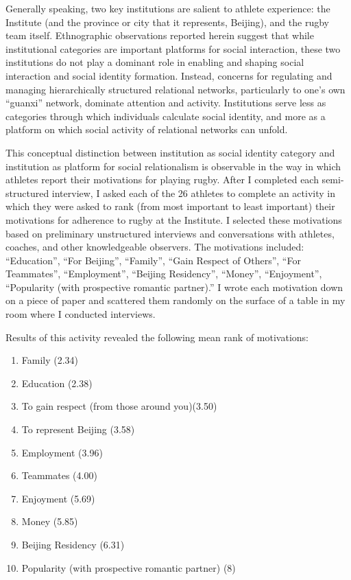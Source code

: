 \begin{CJK}{UTF8}{gbsn}
Generally speaking, two key institutions are salient to athlete experience: the Institute (and the province or city that it represents, Beijing), and the rugby team itself.  Ethnographic observations reported herein suggest that while institutional categories are important platforms for social interaction, these two institutions do not play a dominant role in enabling and shaping social interaction and social identity formation.  Instead, concerns for regulating and managing hierarchically structured relational networks, particularly to one's own ``guanxi'' network, dominate attention and activity.  Institutions serve less as categories through which individuals calculate social identity, and more as a platform on which social activity of relational networks can unfold.

This conceptual distinction between institution as social identity category and institution as platform for social relationalism is observable in the way in which athletes report their motivations for playing rugby.  After I completed each semi-structured interview, I asked each of the 26 athletes to complete an activity in which they were asked to rank (from most important to least important) their motivations for adherence to rugby at the Institute.  I selected these motivations based on preliminary unstructured interviews and conversations with athletes, coaches, and other knowledgeable observers.  The motivations included: ``Education'', ``For Beijing'', ``Family'', ``Gain Respect of Others'', ``For Teammates'', ``Employment'', ``Beijing Residency'', ``Money'', ``Enjoyment'', ``Popularity (with prospective romantic partner).'' I wrote each motivation down on a piece of paper and scattered them randomly on the surface of a table in my room where I conducted interviews.

Results of this activity revealed the following mean rank of motivations:

  \begin{enumerate}
    \item Family (2.34)
    \item Education (2.38)
    \item To gain respect (from those around you)(3.50)
    \item To represent Beijing (3.58)
    \item Employment (3.96)
    \item Teammates (4.00)
    \item Enjoyment (5.69)
    \item Money (5.85)
    \item Beijing Residency (6.31)
    \item Popularity (with prospective romantic partner) (8)
  \end{enumerate}


\end{CJK}
